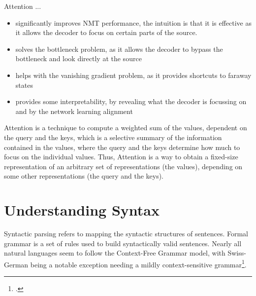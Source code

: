 \documentclass[11pt]{article}
\begin{document}
\noindent
Attention ...
\begin{itemize}
	\item significantly improves NMT performance, the intuition is that it is effective as it allows the decoder to focus on certain parts of the source.
	\item solves the bottleneck problem, as it allows the decoder to bypass the bottleneck and look directly at the source
	\item helps with the vanishing gradient problem, as it provides shortcuts to faraway states
	\item provides some interpretability, by revealing what the decoder is focussing on and by the network learning alignment
\end{itemize}

Attention is a technique to compute a weighted sum of the values, dependent on the query and the keys, which is a selective summary of the information contained in the values, where the query and the keys determine how much to focus on the individual values. Thus, Attention is a way to obtain a fixed-size representation of an arbitrary set of representations (the values), depending on some other representations (the query and the keys).

\section{Understanding Syntax}
Syntactic parsing refers to mapping the syntactic structures of sentences. Formal grammar is a set of rules used to build syntactically valid sentences. Nearly all natural languages seem to follow the Context-Free Grammar model, with Swiss-German being a notable exception needing a mildly context-sensitive grammar\footcite{shieber1985evidence}.
\end{document}
